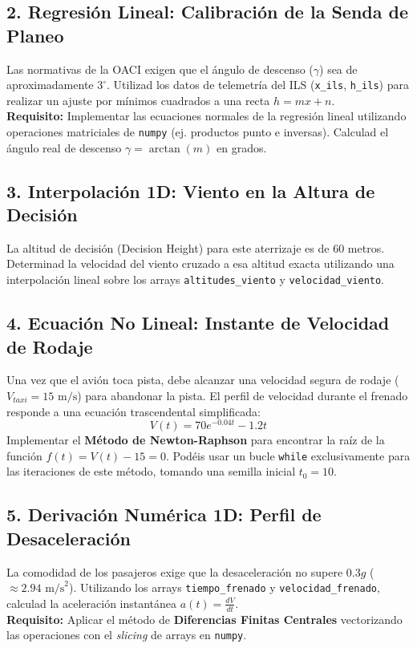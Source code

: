 	
	\subsection*{2. Regresión Lineal: Calibración de la Senda de Planeo}
	Las normativas de la OACI exigen que el ángulo de descenso ($\gamma$) sea de aproximadamente $3^\circ$. Utilizad los datos de telemetría del ILS (\texttt{x\_ils}, \texttt{h\_ils}) para realizar un ajuste por mínimos cuadrados a una recta $h = m x + n$. \\
	\textbf{Requisito:} Implementar las ecuaciones normales de la 
	regresión lineal utilizando operaciones matriciales de \texttt{numpy} (ej. productos punto e inversas). Calculad el ángulo real de descenso $\gamma = \arctan(m)$ en grados.
	
	\subsection*{3. Interpolación 1D: Viento en la Altura de Decisión}
	La altitud de decisión (Decision Height) para este aterrizaje 
	es de $60$ metros. 
	Determinad la velocidad del viento cruzado a esa altitud 
	exacta utilizando una interpolación lineal sobre 
	los arrays \texttt{altitudes\_viento} y 
	\texttt{velocidad\_viento}. \\
	
	
	\subsection*{4. Ecuación No Lineal: Instante de Velocidad de Rodaje}
	Una vez que el avión toca pista, debe alcanzar una velocidad segura de rodaje ($V_{taxi} = 15 \text{ m/s}$) para abandonar la pista. El perfil de velocidad durante el frenado responde a una ecuación trascendental simplificada:
	\begin{equation}
		V(t) = 70 e^{-0.04 t} - 1.2 t
	\end{equation}
	Implementar el \textbf{Método de Newton-Raphson} 
	para encontrar la raíz de la función $f(t) = V(t) - 15 = 0$. 
	Podéis usar un bucle \texttt{while} exclusivamente para las 
	iteraciones de este método, tomando una semilla inicial $t_0 = 10$.
	
	\subsection*{5. Derivación Numérica 1D: Perfil de Desaceleración}
	La comodidad de los pasajeros exige que la desaceleración no supere $0.3g$ ($\approx 2.94 \text{ m/s}^2$). Utilizando los arrays \texttt{tiempo\_frenado} y \texttt{velocidad\_frenado}, calculad la aceleración instantánea $a(t) = \frac{dV}{dt}$. \\
	\textbf{Requisito:} Aplicar el método de 
	\textbf{Diferencias Finitas Centrales} 
	vectorizando las operaciones con el \textit{slicing} 
	de arrays en \texttt{numpy}.
